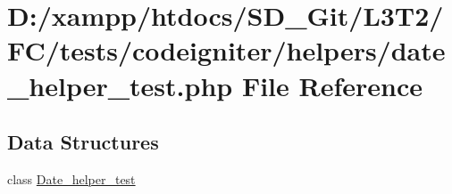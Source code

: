 \hypertarget{tests_2codeigniter_2helpers_2date__helper__test_8php}{}\section{D\+:/xampp/htdocs/\+S\+D\+\_\+\+Git/\+L3\+T2/\+F\+C/tests/codeigniter/helpers/date\+\_\+helper\+\_\+test.php File Reference}
\label{tests_2codeigniter_2helpers_2date__helper__test_8php}
\subsection*{Data Structures}
\begin{DoxyCompactItemize}
\item 
class \hyperlink{class_date__helper__test}{Date\+\_\+helper\+\_\+test}
\end{DoxyCompactItemize}

